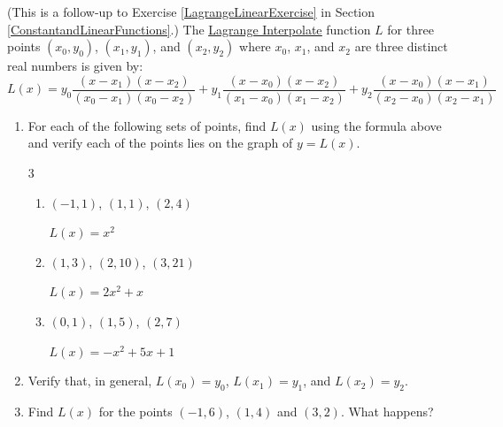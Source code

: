 \documentclass{ximera}
\begin{document}
\begin{problem}\label{LagrangeQuadExercise} 
(This is a follow-up to Exercise \ref{LagrangeLinearExercise} in Section \ref{ConstantandLinearFunctions}.) The \href{https://en.wikipedia.org/wiki/Lagrange_polynomial}{\underline{Lagrange Interpolate}} function $L$ for three points $(x_{0}, y_{0})$, $(x_{1}, y_{1})$, and  $(x_{2}, y_{2})$ where $x_{0}$,  $x_{1}$, and $x_{2}$ are three distinct real numbers  is given by: \[L(x) = y_{0}  \frac{(x - x_{1}) (x - x_{2}) }{(x_{0} - x_{1})(x_{0} - x_{2})}+ y_{1}  \frac{(x - x_{0}) (x - x_{2}) }{(x_{1} - x_{0})(x_{1} - x_{2})} +  y_{2}  \frac{(x - x_{0}) (x - x_{1}) }{(x_{2} - x_{0})(x_{2} - x_{1})}\]

\begin{enumerate}

\item For each of the following sets of points,  find  $L(x)$ using the formula above and verify each of the points lies on the graph of $y = L(x)$.

\begin{multicols}{3}

\begin{enumerate}

\item  $(-1,1)$, $(1,1)$, $(2,4)$ %

\begin{solution}
    $L(x) = x^2$
\end{solution}

\item  $(1,3)$, $(2,10)$, $(3,21)$ %

\begin{solution}
    $L(x) = 2x^2+x$
\end{solution}

\item  $(0,1)$,  $(1,5)$, $(2,7)$ %

\begin{solution}
    $L(x) = -x^2+5x+1$
\end{solution}

\end{enumerate}

\end{multicols}

\item  Verify that, in general, $L(x_{0}) = y_{0}$,  $L(x_{1}) = y_{1}$, and $L(x_{2}) = y_{2}$.

\item Find $L(x)$ for the points $(-1, 6)$, $(1, 4)$ and $(3,2)$.  What happens?  %


\end{enumerate}
\end{problem}
\end{document}
